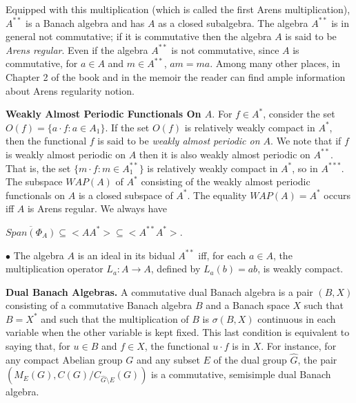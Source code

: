 \documentclass[12pt, twoside, leqno]{article}
\theoremstyle{definition}
\theoremstyle{definition}
\numberwithin{equation}{section}
\begin{document}
\noindent Equipped with this multiplication (which is called the first Arens multiplication), $ A^{**} $ is a Banach algebra and has $ A $ as a closed subalgebra.  The algebra $ A^{**} $ is in general not commutative; if it is commutative then the algebra $ A $ is said to be \textit{Arens regular}. Even if the algebra $ A^{**} $ is not commutative, since $ A $ is commutative, for $ a\in A $ and $ m\in A^{**} $, $ am=ma $.  Among many other places, in Chapter 2 of the book \cite {Dales_01} and in the memoir \cite {dales_lau_01}  the reader can find ample information about Arens regularity notion. \vspace{2mm} 

\textbf{ Weakly Almost Periodic Functionals On $ A $}. For $ f\in A^{*} $, consider the set $ O(f)=\{a\cdot f:a\in A_{1}\} $. If the set $ O(f) $ is relatively weakly compact in $ A^{*} $, then the functional $ f $ is said to be \textit{weakly almost periodic on $ A $}. We note that if $ f $ is weakly almost periodic on $ A $ then it is also weakly almost periodic on $ A^{**} $. That is, the set $ \{m\cdot f:m\in A^{**}_{1}\} $ is relatively weakly compact in $ A^{*} $, so in $ A^{***} $. The subspace $ WAP(A) $ of $ A^{*} $ consisting of the weakly almost periodic functionals on $ A $ is a closed subspace of $ A^{*} $. The equality $ WAP(A)=A^{*} $ occurs iff $ A $ is Arens regular.  We always have\vspace{2mm}

$ \overline{Span(\Phi_{A})}\subseteq <AA^{*}>\subseteq <A^{**}A^{*}> $.\vspace{2mm}  

\noindent$\bullet$ The algebra $ A $ is an ideal in its bidual $ A^{**} $ iff, for each $ a\in A $, the multiplication operator $ L_{a}:A\rightarrow A $, defined by $ L_{a}(b)=ab $, is weakly compact.\vspace{2mm}

\textbf{Dual Banach Algebras.} A commutative dual Banach algebra is a pair $ (B,X) $ consisting of a commutative Banach algebra $ B $ and a Banach space $ X $ such that $ B=X^{*} $ and such that the multiplication of $ B $ is $ \sigma(B,X) $ continuous in each variable when the other variable is kept fixed. This last condition is equivalent to saying that, for $ u\in B $ and $ f\in X $, the functional $ u\cdot f $ is in $ X $. For instance, for any compact Abelian group $ G $ and any subset $E$ of the dual group $\hat{G}$, the pair $ (M_{E}(G),C(G)/C_{\hat{G}\setminus E}(G)) $ is a commutative, semisimple dual Banach algebra.\vspace{2mm}
\end{document}

